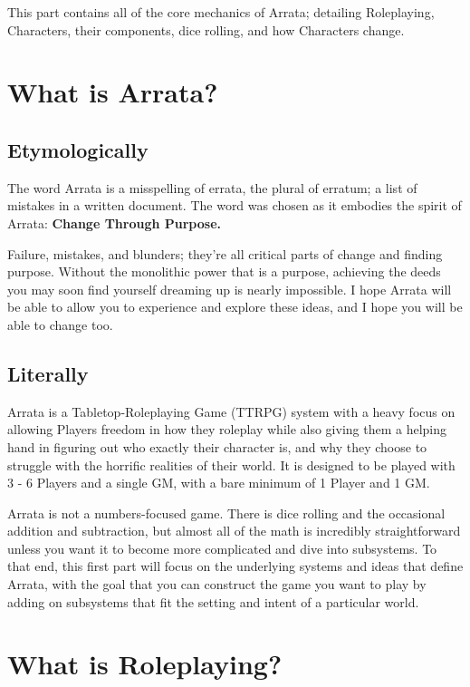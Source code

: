 \documentclass[../main.tex]{subfiles}
\begin{document}
    This part contains all of the core mechanics of Arrata; detailing Roleplaying, Characters, their components, dice rolling, and how Characters change.

    \section{What is Arrata?}

    \subsection{Etymologically}
    The word Arrata is a misspelling of errata, the plural of erratum; a list of mistakes in a written document. The word was chosen as it embodies the spirit of Arrata: \textbf{Change Through Purpose.}

    Failure, mistakes, and blunders; they're all critical parts of change and finding purpose. Without the monolithic power that is a purpose, achieving the deeds you may soon find yourself dreaming up is nearly impossible. I hope Arrata will be able to allow you to experience and explore these ideas, and I hope you will be able to change too.
    
    \subsection{Literally}
    Arrata is a Tabletop-Roleplaying Game (TTRPG) system with a heavy focus on allowing Players freedom in how they roleplay while also giving them a helping hand in figuring out who exactly their character is, and why they choose to struggle with the horrific realities of their world. It is designed to be played with 3 - 6 Players and a single GM, with a bare minimum of 1 Player and 1 GM.

    Arrata is not a numbers-focused game. There is dice rolling and the occasional addition and subtraction, but almost all of the math is incredibly straightforward unless you want it to become more complicated and dive into subsystems. To that end, this first part will focus on the underlying systems and ideas that define Arrata, with the goal that you can construct the game you want to play by adding on subsystems that fit the setting and intent of a particular world.
    

    \section{What is Roleplaying?}
\end{document}

